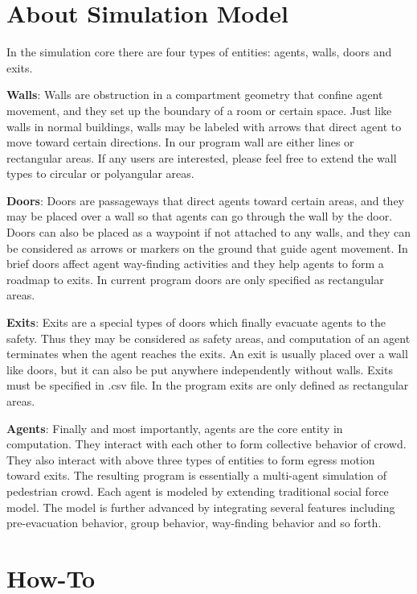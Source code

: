 \documentclass{article}
\begin{document}
\section{About Simulation Model}

In the simulation core there are four types of entities: agents, walls, doors and exits.

\textbf{Walls}: Walls are obstruction in a compartment geometry that confine agent movement, and they set up the boundary of a room or certain space.  Just like walls in normal buildings, walls may be labeled with arrows that direct agent to move toward certain directions.  In our program wall are either lines or rectangular areas.  If any users are interested, please feel free to extend the wall types to circular or polyangular areas.

\textbf{Doors}: Doors are passageways that direct agents toward certain areas, and they may be placed over a wall so that agents can go through the wall by the door.  Doors can also be placed as a waypoint if not attached to any walls, and they can be considered as arrows or markers on the ground that guide agent movement.  In brief doors affect agent way-finding activities and they help agents to form a roadmap to exits.  In current program doors are only specified as rectangular areas.

\textbf{Exits}: Exits are a special types of doors which finally evacuate agents to the safety.  Thus they may be considered as safety areas, and computation of an agent terminates when the agent reaches the exits.  An exit is usually placed over a wall like doors, but it can also be put anywhere independently without walls.  Exits must be specified in .csv file.  In the program exits are only defined as rectangular areas.

\textbf{Agents}: Finally and most importantly, agents are the core entity in computation.  They interact with each other to form collective behavior of crowd.  They also interact with above three types of entities to form egress motion toward exits.  The resulting program is essentially a multi-agent simulation of pedestrian crowd.  Each agent is modeled by extending traditional social force model.  The model is further advanced by integrating several features including pre-evacuation behavior, group behavior, way-finding behavior and so forth.


\section{How-To}
\end{document}

